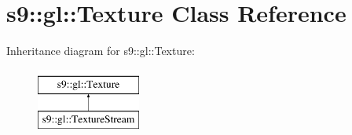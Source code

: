 \hypertarget{classs9_1_1gl_1_1Texture}{\section{s9\-:\-:gl\-:\-:Texture Class Reference}
\label{classs9_1_1gl_1_1Texture}
}
Inheritance diagram for s9\-:\-:gl\-:\-:Texture\-:\begin{figure}[H]
\begin{center}
\leavevmode
\includegraphics[height=2.000000cm]{classs9_1_1gl_1_1Texture}
\end{center}
\end{figure}
